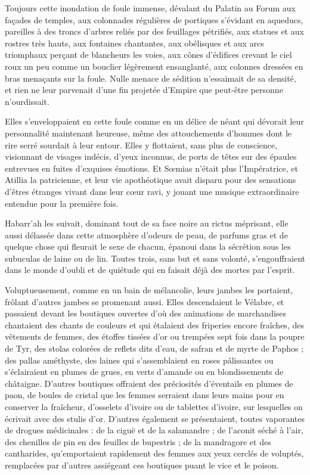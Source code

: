 \documentclass[a4paper, 11pt, oneside, polutonikogreek, french]{article}
\begin{document}
Toujours cette inondation de foule immense, dévalant du Palatin au Forum aux façades de temples, aux colonnades régulières de portiques s'évidant en aqueducs, pareilles à des troncs d'arbres reliés par des feuillages pétrifiés, aux statues et aux rostres très hauts, aux fontaines chantantes, aux obélisques et aux arcs triomphaux perçant de blancheurs les voies, aux cônes d'édifices crevant le ciel roux un peu comme un bouclier légèrement ensanglanté, aux colonnes dressées en bras menaçants sur la foule. Nulle menace de sédition n'essaimait de sa densité, et rien ne leur parvenait d'une fin projetée d'Empire que peut-être personne n'ourdissait.

Elles s'enveloppaient en cette foule comme en un délice de néant qui dévorait leur personnalité maintenant heureuse, même des attouchements d'hommes dont le rire serré sourdait à leur entour. Elles y flottaient, sans plus de conscience, visionnant de visages indécis, d'yeux inconnus, de ports de têtes sur des épaules entrevues en fuites d'exquises émotions. Et Sœmias n'était plus l'Impératrice, et Atillia la patricienne, et leur vie apothéotique avait disparu pour des sensations d'êtres étranges vivant dans leur cœur ravi, y jouant une musique extraordinaire entendue pour la première fois.

Habarr'ah les suivait, dominant tout de sa face noire au rictus méprisant, elle aussi délassée dans cette atmosphère d'odeurs de peau, de parfums gras et de quelque chose qui fleurait le sexe de chacun, épanoui dans la sécrétion sous les subuculas de laine ou de lin. Toutes trois, sans but et sans volonté, s'engouffraient dans le monde d'oubli et de quiétude qui en faisait déjà des mortes par l'esprit.

Voluptueusement, comme en un bain de mélancolie, leurs jambes les portaient, frôlant d'autres jambes se promenant aussi. Elles descendaient le Vélabre, et passaient devant les boutiques ouvertes d'où des animations de marchandises chantaient des chants de couleurs et qui étalaient des friperies encore fraîches, des vêtements de femmes, des étoffes tissées d'or ou trempées sept fois dans la poupre de Tyr, des stolas colorées de reflets dits d'eau, de safran et de myrte de Paphos ; des pallas améthyste, des laines qui s'assemblaient en roses pâlissantes ou s'éclairaient en plumes de grues, en verts d'amande ou en blondissements de châtaigne. D'autres boutiques offraient des préciosités d'éventails en plumes de paon, de boules de cristal que les femmes serraient dans leurs mains pour en conserver la fraîcheur, d'osselets d'ivoire ou de tablettes d'ivoire, sur lesquelles on écrivait avec des stulis d'or. D'autres également se présentaient, toutes vaporantes de drogues médicinales : de la ciguë et de la salamandre ; de l'aconit séché à l'air, des chenilles de pin en des feuilles de bupestris ; de la mandragore et des cantharides, qu'emportaient rapidement des femmes aux yeux cerclés de voluptés, remplacées par d'autres assiégeant ces boutiques puant le vice et le poison.
\end{document}
